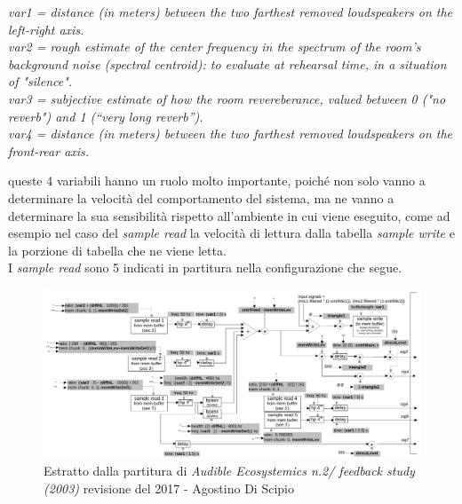 \begin{center}
    \vspace{0.5cm}
    \textit{var1 = distance (in meters) between the two farthest removed loudspeakers on the left-right axis.} \\
    \textit{var2 = rough estimate of the center frequency in the spectrum of the room’s background noise (spectral centroid): to evaluate at rehearsal time, in a situation of "silence".} \\
    \textit{var3 = subjective estimate of how the room revereberance, valued between 0 ("no reverb") and 1 (“very long reverb”).} \\
    \textit{var4 = distance (in meters) between the two farthest removed loudspeakers on the front-rear axis.}
    \vspace{0.5cm}
\end{center}

queste 4 variabili hanno un ruolo molto importante, poiché non solo vanno a determinare la velocità del
comportamento del sistema, ma ne vanno a determinare la sua sensibilità rispetto all'ambiente in cui viene 
eseguito, come ad esempio nel caso del \textit{sample read} la velocità di lettura dalla tabella \textit{sample write} 
e la porzione di tabella che ne viene letta. \\
I \textit{sample read} sono 5 indicati in partitura nella configurazione che segue.

\begin{figure}[h!]
\begin{center}
\includegraphics[width=14cm]{figures/SAMPLERSFeedbackstudy2017.pdf}
\caption{Estratto dalla partitura di \textit{Audible Ecosystemics n.2/ feedback study (2003)}
revisione del 2017 - Agostino Di Scipio} 
\vspace{0.5cm}
\end{center}
\end{figure} 

